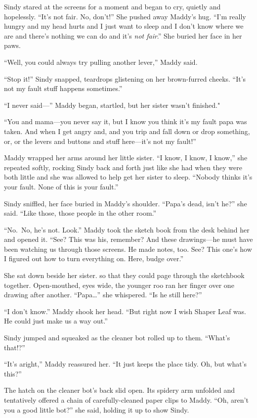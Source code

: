 \documentclass[10pt]{article}
\begin{document}
Sindy stared at the screens for a moment and began to cry, quietly and
hopelessly. ``It's not fair. No, don't!'' She pushed away Maddy's hug.
``I'm really hungry and my head hurts and I just want to sleep and I
don't know where we are and there's nothing we can do and it's \emph{not
fair}.'' She buried her face in her paws.

``Well, you could always try pulling another lever,'' Maddy said.

``Stop it!'' Sindy snapped, teardrops glistening on her brown-furred
cheeks. ``It's not my fault stuff happens sometimes.''

``I never said---'' Maddy began, startled, but her sister wasn't
finished."

``You and mama---you never say it, but I know you think it's my fault
papa was taken. And when I get angry and, and you trip and fall down or
drop something, or, or the levers and buttons and stuff here---it's not
my fault!''

Maddy wrapped her arms around her little sister. ``I know, I know, I
know,'' she repeated softly, rocking Sindy back and forth just like she
had when they were both little and she was allowed to help get her
sister to sleep. ``Nobody thinks it's your fault. None of this is your
fault.''

Sindy sniffled, her face buried in Maddy's shoulder. ``Papa's dead,
isn't he?'' she said. ``Like those, those people in the other room.''

``No.~No, he's not. Look.'' Maddy took the sketch book from the desk
behind her and opened it. ``See? This was his, remember? And these
drawings---he must have been watching us through those screens. He made
notes, too. See? This one's how I figured out how to turn everything on.
Here, budge over.''

She sat down beside her sister. so that they could page through the
sketchbook together. Open-mouthed, eyes wide, the younger roo ran her
finger over one drawing after another. ``Papa\ldots{}'' she whispered.
``Is he still here?''

``I don't know.'' Maddy shook her head. ``But right now I wish Shaper
Leaf was. He could just make us a way out.''

Sindy jumped and squeaked as the cleaner bot rolled up to them. ``What's
that!?''

``It's aright,'' Maddy reassured her. ``It just keeps the place tidy.
Oh, but what's this?''

The hatch on the cleaner bot's back slid open. Its spidery arm unfolded
and tentatively offered a chain of carefully-cleaned paper clips to
Maddy. ``Oh, aren't you a good little bot?'' she said, holding it up to
show Sindy.
\end{document}
